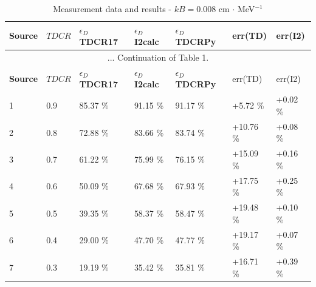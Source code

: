 \documentclass[12pt]{iopart}
\begin{document}
\begingroup
\footnotesize
\begin{longtable}[l]{| p{} | p{} |p{} |p{} |p{} |p{} |p{} |} 
\caption{Measurement data and results - $kB = 0.008$ cm $\cdot$ MeV$^{-1}$}
\label{Table1} \\ 
\hline
\textbf{Source} & \textbf{$TDCR$} & \textbf{$\epsilon_{D}$ TDCR17} & \textbf{$\epsilon_{D}$ I2calc} & \textbf{$\epsilon_{D}$ TDCRPy} & err(TD)& err(I2) \\
\endfirsthead
\multicolumn{7}{c}{... Continuation of Table 1.}\\ 
\hline
 \textbf{Source} & \textbf{$TDCR$} & \textbf{$\epsilon_{D}$ TDCR17} & \textbf{$\epsilon_{D}$ I2calc} & \textbf{$\epsilon_{D}$ TDCRPy} & err(TD)& err(I2) \\   \hline 
\endhead
\hline
 1 & 0.9   &   85.37 \% & 91.15 \% & 91.17 \% &  +5.72 \%  & +0.02 \%\\
 2 & 0.8   &   72.88 \% & 83.66 \% & 83.74 \% &  +10.76 \% & +0.08 \%\\
 3 & 0.7   &   61.22 \% & 75.99 \% & 76.15 \% &  +15.09 \% & +0.16 \%\\
 4 & 0.6   &   50.09 \% & 67.68 \% & 67.93 \% &  +17.75 \% & +0.25 \%\\
 5 & 0.5   &   39.35 \% & 58.37 \% & 58.47 \% &  +19.48 \% & +0.10 \%\\
 6 & 0.4   &   29.00 \% & 47.70 \% & 47.77 \% &  +19.17 \% & +0.07 \%\\
 7 & 0.3   &   19.19 \% & 35.42 \% & 35.81 \% &  +16.71 \% & +0.39 \%\\
\hline
\end{longtable} 
\endgroup
\end{document}
